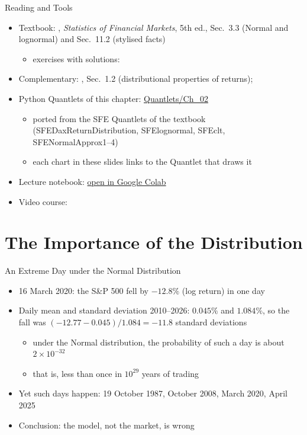 \begin{frame}{Reading and Tools}
\itemsize{\small}
\begin{itemize}
    \item Textbook: , \textit{Statistics of Financial Markets}, 5th ed., Sec.~3.3 (Normal and lognormal) and Sec.~11.2 (stylised facts)
    \begin{itemize}
        \item exercises with solutions: 
    \end{itemize}
    \item Complementary: , Sec.~1.2 (distributional properties of returns); 
    \item Python Quantlets of this chapter: \href{https://github.com/danpele/SFM/tree/main/Quantlets/Ch_02}{Quantlets/Ch\_02}
    \begin{itemize}
        \item ported from the SFE Quantlets of the textbook (SFEDaxReturnDistribution, SFElognormal, SFEclt, SFENormalApprox1--4)
        \item each chart in these slides links to the Quantlet that draws it
    \end{itemize}
    \item Lecture notebook: \href{\colaburl{notebooks/EN/chapter2_lecture_notebook.ipynb}}{open in Google Colab}
    \item Video course: 
\end{itemize}
\end{frame}


\section{The Importance of the Distribution}

\begin{frame}{An Extreme Day under the Normal Distribution}
\itemsize{\small}
\begin{itemize}
    \item 16 March 2020: the S\&P 500 fell by $-12.8\%$ (log return) in one day
    \item Daily mean and standard deviation 2010--2026: $0.045\%$ and $1.084\%$, so the fall was $(-12.77 - 0.045)/1.084 = -11.8$ standard deviations
    \begin{itemize}
        \item under the Normal distribution, the probability of such a day is about $2 \times 10^{-32}$
        \item that is, less than once in $10^{29}$ years of trading
    \end{itemize}
    \item Yet such days happen: 19 October 1987, October 2008, March 2020, April 2025
    \item Conclusion: the model, not the market, is wrong
\end{itemize}
\end{frame}

